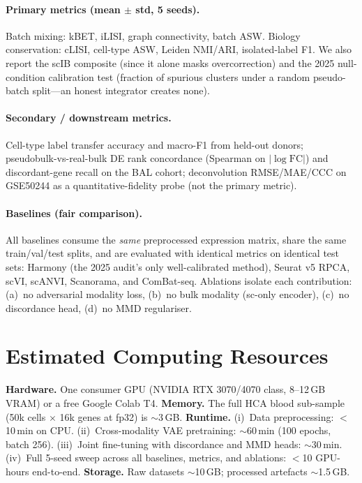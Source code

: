\documentclass[11pt]{article}
\begin{document}
\paragraph{Primary metrics (mean $\pm$ std, 5 seeds).}
Batch mixing: kBET, iLISI, graph connectivity, batch ASW. Biology
conservation: cLISI, cell-type ASW, Leiden NMI/ARI, isolated-label F1. We
also report the scIB composite (since it alone masks overcorrection) and the
2025 null-condition calibration test (fraction of spurious clusters under a
random pseudo-batch split---an honest integrator creates none).

\paragraph{Secondary / downstream metrics.}
Cell-type label transfer accuracy and macro-F1 from held-out donors;
pseudobulk-vs-real-bulk DE rank concordance (Spearman on $|\log\mathrm{FC}|$)
and discordant-gene recall on the BAL cohort; deconvolution RMSE/MAE/CCC on
GSE50244 as a quantitative-fidelity probe (not the primary metric).

\paragraph{Baselines (fair comparison).}
All baselines consume the \emph{same} preprocessed expression matrix, share
the same train/val/test splits, and are evaluated with identical metrics on
identical test sets: Harmony (the 2025 audit's only well-calibrated method),
Seurat v5 RPCA, scVI, scANVI, Scanorama, and ComBat-seq. Ablations isolate
each contribution: (a)~no adversarial modality loss, (b)~no bulk modality
(sc-only encoder), (c)~no discordance head, (d)~no MMD regulariser.

\section{Estimated Computing Resources}

\textbf{Hardware.} One consumer GPU (NVIDIA RTX 3070/4070 class, 8--12\,GB
VRAM) or a free Google Colab T4. \textbf{Memory.} The full HCA blood
sub-sample (50k cells $\times$ 16k genes at fp32) is $\sim$3\,GB.
\textbf{Runtime.}
(i)~Data preprocessing: $<$10\,min on CPU.
(ii)~Cross-modality VAE pretraining: $\sim$60\,min (100 epochs, batch 256).
(iii)~Joint fine-tuning with discordance and MMD heads: $\sim$30\,min.
(iv)~Full 5-seed sweep across all baselines, metrics, and ablations:
$<$10 GPU-hours end-to-end.
\textbf{Storage.} Raw datasets $\sim$10\,GB; processed artefacts $\sim$1.5\,GB.
\end{document}
